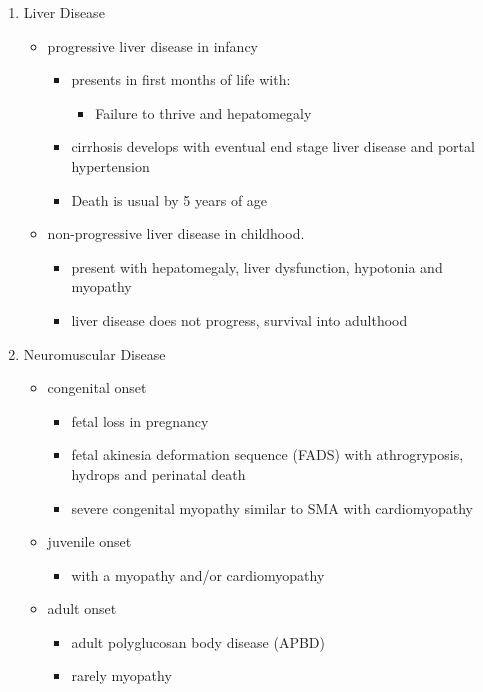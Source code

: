 \documentclass{scrartcl}
\begin{document}
\begin{enumerate}
\item Liver Disease
\label{sec:orgaa43489}
\begin{itemize}
\item progressive liver disease in infancy
\begin{itemize}
\item presents in first months of life with:
\begin{itemize}
\item Failure to thrive and hepatomegaly
\end{itemize}
\item cirrhosis develops with eventual end stage liver disease and
portal hypertension
\item Death is usual by 5 years of age
\end{itemize}
\item non-progressive liver disease in childhood.
\begin{itemize}
\item present with hepatomegaly, liver dysfunction, hypotonia and
myopathy
\item liver disease does not progress, survival into adulthood
\end{itemize}
\end{itemize}

\item Neuromuscular Disease
\label{sec:org6459c66}
\begin{itemize}
\item congenital onset
\begin{itemize}
\item fetal loss in pregnancy
\item fetal akinesia deformation sequence (FADS) with athrogryposis, hydrops and perinatal death
\item severe congenital myopathy similar to SMA with \textpm{} cardiomyopathy
\end{itemize}
\item juvenile onset
\begin{itemize}
\item with a myopathy and/or cardiomyopathy
\end{itemize}
\item adult onset
\begin{itemize}
\item adult polyglucosan body disease (APBD)
\item rarely myopathy
\end{itemize}
\end{itemize}
\end{enumerate}
\end{document}

